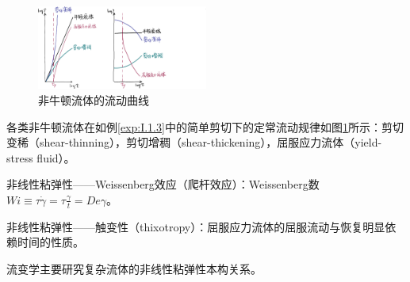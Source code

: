 \documentclass[main.tex]{subfiles}
\begin{document}
\begin{figure}[h]
\centering
\includegraphics[width=0.5\textwidth]{images/I.2.2.eps}
\caption{非牛顿流体的流动曲线}
\label{fig:I.2.2}
\end{figure}

\begin{example}
各类非牛顿流体在如例\ref{exp:I.1.3}中的简单剪切下的定常流动规律如图\ref{fig:I.2.2}所示：剪切变稀（shear-thinning），剪切增稠（shear-thickening），屈服应力流体（yield-stress fluid）。
\end{example}

非线性粘弹性——Weissenberg效应（爬杆效应）：Weissenberg数$Wi\equiv\tau\dot{\gamma}=\tau\frac{\gamma}{t}=De\gamma$。

非线性粘弹性——触变性（thixotropy）：屈服应力流体的屈服流动与恢复明显依赖时间的性质。

流变学主要研究复杂流体的非线性粘弹性本构关系。
\end{document}

